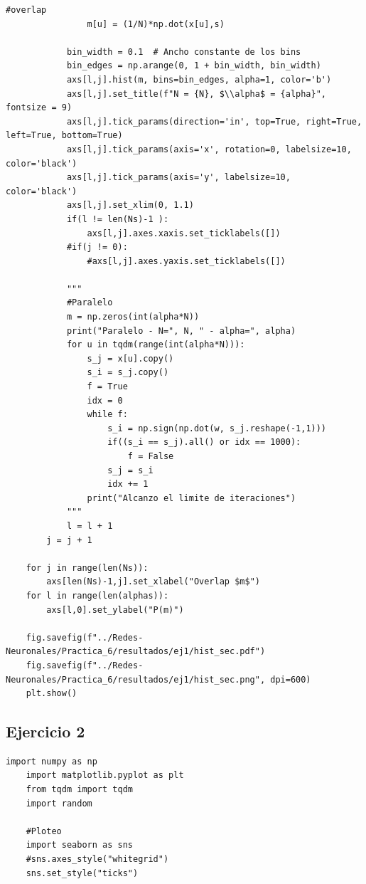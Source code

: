 \documentclass[11pt,twocolumn,twoside]{opticajnl}
\begin{document}
\begin{onecolumn}
\begin{lstlisting}[style=mystyle]
                #overlap
                m[u] = (1/N)*np.dot(x[u],s)
    
            bin_width = 0.1  # Ancho constante de los bins
            bin_edges = np.arange(0, 1 + bin_width, bin_width)
            axs[l,j].hist(m, bins=bin_edges, alpha=1, color='b')
            axs[l,j].set_title(f"N = {N}, $\\alpha$ = {alpha}", fontsize = 9)
            axs[l,j].tick_params(direction='in', top=True, right=True, left=True, bottom=True)
            axs[l,j].tick_params(axis='x', rotation=0, labelsize=10, color='black')
            axs[l,j].tick_params(axis='y', labelsize=10, color='black')
            axs[l,j].set_xlim(0, 1.1)
            if(l != len(Ns)-1 ):
                axs[l,j].axes.xaxis.set_ticklabels([])
            #if(j != 0):
                #axs[l,j].axes.yaxis.set_ticklabels([])
        
            """
            #Paralelo
            m = np.zeros(int(alpha*N))
            print("Paralelo - N=", N, " - alpha=", alpha)
            for u in tqdm(range(int(alpha*N))):
                s_j = x[u].copy()
                s_i = s_j.copy()
                f = True 
                idx = 0
                while f:
                    s_i = np.sign(np.dot(w, s_j.reshape(-1,1)))
                    if((s_i == s_j).all() or idx == 1000):
                        f = False
                    s_j = s_i
                    idx += 1    
                print("Alcanzo el limite de iteraciones")
            """
            l = l + 1
        j = j + 1 
    
    for j in range(len(Ns)):
        axs[len(Ns)-1,j].set_xlabel("Overlap $m$")
    for l in range(len(alphas)):
        axs[l,0].set_ylabel("P(m)")
    
    fig.savefig(f"../Redes-Neuronales/Practica_6/resultados/ej1/hist_sec.pdf")
    fig.savefig(f"../Redes-Neuronales/Practica_6/resultados/ej1/hist_sec.png", dpi=600)
    plt.show()
\end{lstlisting}
\subsection{Ejercicio 2}
\begin{lstlisting}[style=mystyle]
    import numpy as np
    import matplotlib.pyplot as plt
    from tqdm import tqdm
    import random
    
    #Ploteo 
    import seaborn as sns
    #sns.axes_style("whitegrid")
    sns.set_style("ticks")
    

\end{lstlisting}
\end{onecolumn}
\end{document}
